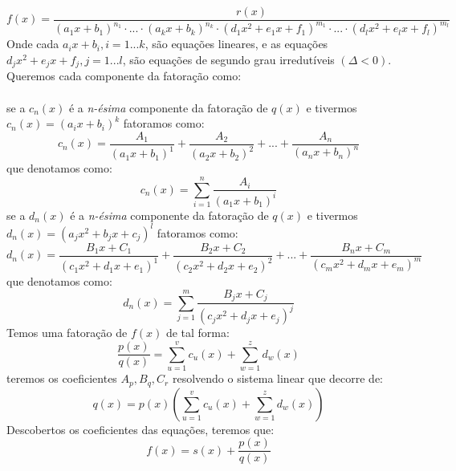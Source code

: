 \begin{equation}
    \textstyle
    f(x) = \frac{
        r(x)
    }{
        (a_1x + b_1)^{n_1}
        \cdot ... \cdot 
        (a_kx + b_k)^{n_k}
        \cdot
        (d_1x^2 + e_1x + f_1)^{m_1}
        \cdot ... \cdot 
        (d_lx^2 + e_lx + f_l)^{m_l}
    }
\end{equation}
Onde cada \(a_ix + b_i, i = 1...k\), são equações lineares, e as equações \(d_jx^2 + e_jx + f_j, j = 1...l\), são equações de segundo grau irredutíveis \(( \Delta < 0 )\).
Queremos cada componente da fatoração como:
\\
\\
se a \(c_n(x)\) é a \textit{n-ésima} componente da fatoração de \(q(x)\) e tivermos \(c_n(x) = (a_ix + b_i)^k\) fatoramos como:
\begin{equation*}
    c_n(x) = 
        \frac{A_1}{(a_1x + b_1)^1} +
        \frac{A_2}{(a_2x + b_2)^2} + ... + 
        \frac{A_n}{(a_nx + b_n)^n}
\end{equation*}
que denotamos como:
\begin{equation}
    c_n(x) = \sum_{ i = 1}^{n} \frac{A_i}{(a_1x + b_1)^i}
\end{equation}
se a \(d_n(x)\) é a \textit{n-ésima} componente da fatoração de \(q(x)\) e tivermos \(d_n(x) = (a_jx^2 + b_jx + c_j)^l\) fatoramos como:
\begin{equation}
    d_n(x) = 
        \frac{B_1x + C_1}{(c_1x^2 + d_1x + e_1)^1} +
        \frac{B_2x + C_2}{(c_2x^2 + d_2x + e_2)^2} + ... + 
        \frac{B_nx + C_m}{(c_mx^2 + d_mx + e_m)^m}
\end{equation}
que denotamos como:
\begin{equation}
    d_n(x) = \sum_{j = 1}^{m} \frac{B_jx + C_j}{(c_jx^2 + d_jx + e_j)^j}
\end{equation}
Temos uma fatoração de \(f(x)\) de tal forma:
\begin{equation}
    \frac{p(x)}{q(x)} =
    \sum_{u = 1}^{v} 
        c_u(x) + 
    \sum_{w = 1}^{z} 
        d_w(x)
\end{equation}
teremos os coeficientes \(A_p, B_q, C_r\) resolvendo o sistema linear que decorre de:
\begin{equation}
    q(x) = 
        p(x)
            \left(
                \sum_{u = 1}^{v} 
            c_u(x) + 
                \sum_{w = 1}^{z} 
            d_w(x)
            \right)
\end{equation}
Descobertos os coeficientes das equações, teremos que:
\begin{equation}
    f(x) = 
        s(x) + \frac{p(x)}{q(x)}
\end{equation}
